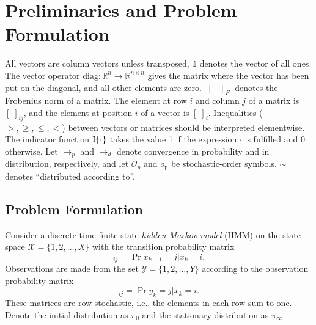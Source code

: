 \documentclass[journal]{IEEEtran}
\newcommand{\op}{o_\text{p}}
\begin{document}



\section{Preliminaries and Problem Formulation}
\label{sec:preliminaries}

All vectors are column vectors unless transposed, $\mathds{1}$ denotes the vector of all
ones. The vector operator $\text{diag}:\mathbb{R}^n \rightarrow \mathbb{R}^{n\times n}$
gives the matrix where the vector has been put on the diagonal, and all other elements are
zero. $\| \cdot \|_F$ denotes the Frobenius norm of a matrix. The element at row $i$ and
column $j$ of a matrix is $[\cdot]_{ij}$, and the element at position $i$ of a vector is
$[\cdot]_i$.  Inequalities ($>, \geq, \leq, <$) between vectors or matrices should be
interpreted elementwise. The indicator function $\text{I}\{\cdot\}$ takes the value 1 if the
expression $\cdot$ is fulfilled and 0 otherwise. Let $\to_p$ and $\to_d$ denote
convergence in probability and in distribution, respectively, and let $\mathcal{O}_p$ and
$\op$ be stochastic-order symbols. $\sim$ denotes ``distributed according to''.

\subsection{Problem Formulation}

Consider a discrete-time finite-state \emph{hidden Markov model} (HMM) on the
state space $\mathcal{X} = \{1, 2, \dots, X\}$ with the transition probability
matrix
\begin{equation}
    [P]_{ij} = \Pr{x_{k+1} = j | x_k = i}.
\end{equation} 
Observations are made from the set $\mathcal{Y} = \{1, 2, \dots, Y\}$ according
to the observation probability matrix
\begin{equation}
    [B]_{ij} = \Pr{y_k = j | x_k = i}.
\end{equation}
These matrices are row-stochastic, i.e., the elements in each row sum to one.
Denote the initial distribution as $\pi_0$ and the stationary distribution as
$\pi_\infty$.
\end{document}
